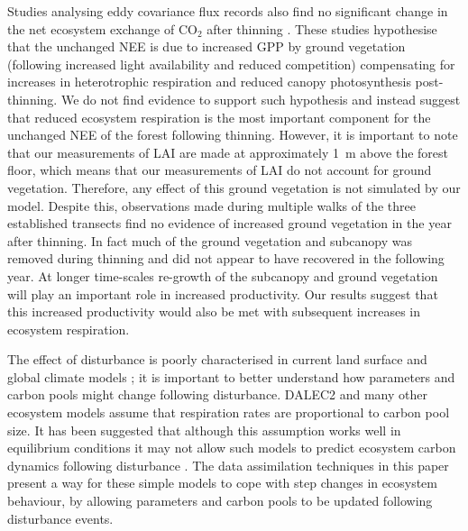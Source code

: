 Studies analysing eddy covariance flux records also find no significant change in the net ecosystem exchange of CO\(_{2}\) after thinning \citep{vesala2005effect, moreaux2011paired, dore2012recovery, wilkinson2016}. These studies hypothesise that the unchanged NEE is due to increased GPP by ground vegetation (following increased light availability and reduced competition) compensating for increases in heterotrophic respiration and reduced canopy photosynthesis post-thinning. We do not find evidence to support such hypothesis and instead suggest that reduced ecosystem respiration is the most important component for the unchanged NEE of the forest following thinning. However, it is important to note that our measurements of LAI are made at approximately 1~m above the forest floor, which means that our measurements of LAI do not account for ground vegetation. Therefore, any effect of this ground vegetation is not simulated by our model. Despite this, observations made during multiple walks of the three established transects find no evidence of increased ground vegetation in the year after thinning. In fact much of the ground vegetation and subcanopy was removed during thinning and did not appear to have recovered in the following year. At longer time-scales re-growth of the subcanopy and ground vegetation will play an important role in increased productivity. Our results suggest that this increased productivity would also be met with subsequent increases in ecosystem respiration.






The effect of disturbance is poorly characterised in current land surface and global climate models \citep{running2008ecosystem}; it is important to better understand how parameters and carbon pools might change following disturbance. DALEC2 and many other ecosystem models assume that respiration rates are proportional to carbon pool size. It has been suggested that although this assumption works well in equilibrium conditions it may not allow such models to predict ecosystem carbon dynamics following disturbance \citep{schimel2003implications}. The data assimilation techniques in this paper present a way for these simple models to cope with step changes in ecosystem behaviour, by allowing parameters and carbon pools to be updated following disturbance events. 


